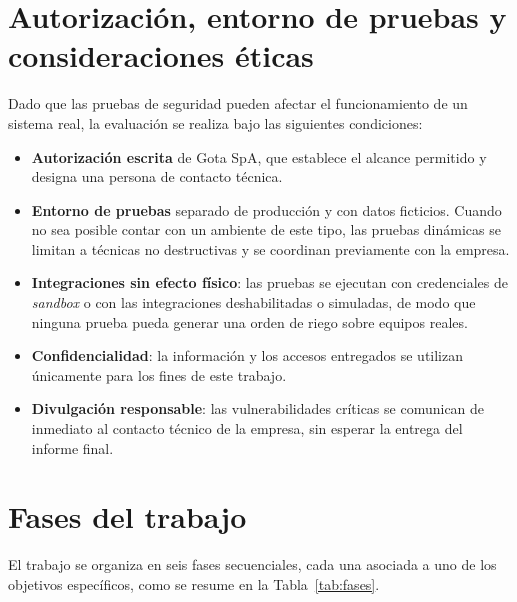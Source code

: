 \documentclass[12pt,letterpaper]{report}
\begin{document}
\section*{Autorización, entorno de pruebas y consideraciones éticas}

Dado que las pruebas de seguridad pueden afectar el funcionamiento de un
sistema real, la evaluación se realiza bajo las siguientes condiciones:

\begin{itemize}[leftmargin=1.25cm]
    \item \textbf{Autorización escrita} de Gota SpA, que establece el alcance
    permitido y designa una persona de contacto técnica.
    \item \textbf{Entorno de pruebas} separado de producción y con datos
    ficticios. Cuando no sea posible contar con un ambiente de este tipo, las
    pruebas dinámicas se limitan a técnicas no destructivas y se coordinan
    previamente con la empresa.
    \item \textbf{Integraciones sin efecto físico}: las pruebas se ejecutan con
    credenciales de \textit{sandbox} o con las integraciones deshabilitadas o
    simuladas, de modo que ninguna prueba pueda generar una orden de riego
    sobre equipos reales.
    \item \textbf{Confidencialidad}: la información y los accesos entregados se
    utilizan únicamente para los fines de este trabajo.
    \item \textbf{Divulgación responsable}: las vulnerabilidades críticas se
    comunican de inmediato al contacto técnico de la empresa, sin esperar la
    entrega del informe final.
\end{itemize}

\section*{Fases del trabajo}

El trabajo se organiza en seis fases secuenciales, cada una asociada a uno de
los objetivos específicos, como se resume en la
Tabla~\ref{tab:fases}.
\end{document}
